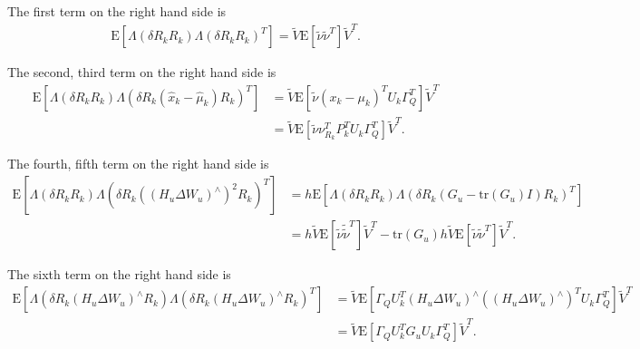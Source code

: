 \documentclass[10pt]{article}
\newcommand{\tr}[1]{\ensuremath{\mathrm{tr}\left( #1 \right)}}
\newcommand{\expect}[1]{\ensuremath{\mathrm{E}\left[ #1 \right]}}
\begin{document}
\noindent The first term on the right hand side is
\begin{align*}
	\expect{\Lambda(\delta R_kR_k)\Lambda(\delta R_kR_k)^T} = \tilde{V}\expect{\tilde{\nu}\tilde{\nu}^T}\tilde{V}^T.
\end{align*}

\noindent The second, third term on the right hand side is
\begin{align*}
	\expect{\Lambda(\delta R_kR_k)\Lambda(\delta R_k(\hat{x}_k-\hat{\mu}_k)R_k)^T} &= \tilde{V}\expect{\tilde{\nu}(x_k-\mu_k)^TU_k\Gamma_Q^T}\tilde{V}^T \\
	&= \tilde{V}\expect{\tilde{\nu}\nu_{R_k}^TP_k^TU_k\Gamma_Q^T}\tilde{V}^T.
\end{align*}

\noindent The fourth, fifth term on the right hand side is
\begin{align*}
	\expect{\Lambda(\delta R_kR_k)\Lambda(\delta R_k((H_u\Delta W_u)^\wedge)^2R_k)^T} &= h\expect{\Lambda(\delta R_kR_k)\Lambda(\delta R_k(G_u-\tr{G_u}I)R_k)^T} \\
	&= h\tilde{V}\expect{\tilde{\nu}\tilde{\tilde{\nu}}^T}\tilde{V}^T - \tr{G_u}h\tilde{V}\expect{\tilde{\nu}\tilde{\nu}^T}\tilde{V}^T.
\end{align*}

\noindent The sixth term on the right hand side is
\begin{align*}
	\expect{\Lambda(\delta R_k(H_u\Delta W_u)^\wedge R_k)\Lambda(\delta R_k(H_u\Delta W_u)^\wedge R_k)^T} &= \tilde{V}\expect{\Gamma_QU_k^T(H_u\Delta W_u)^\wedge((H_u\Delta W_u)^\wedge)^TU_k\Gamma_Q^T}\tilde{V}^T \\
	&= \tilde{V}\expect{\Gamma_QU_k^TG_uU_k\Gamma_Q^T}\tilde{V}^T.
\end{align*}
\end{document}
